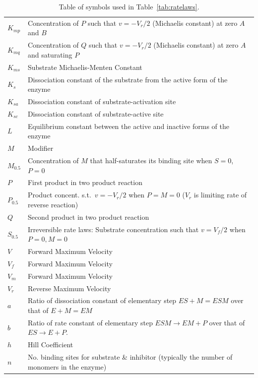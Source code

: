 \documentclass[10pt]{cekarticle}
\newcommand{\changed}[1]{\textcolor{BrickRed}{#1}}
\begin{document}
\begin{table}[ht]
\begin{tabular}{lp{5.5in}}
    $K_{mp}$	& Concentration of $P$ such that $v = -V_r/2$  (Michaelis constant) at zero $A$ and $B$ \\
    $K_{mq}$	& Concentration of $Q$ such that $v = -V_r/2$  (Michaelis constant) at zero $A$ and saturating $P$ \\
    $K_{ms}$	& Substrate Michaelis-Menten Constant \\
    $K_s$	& Dissociation constant of the substrate from the active form of the enzyme \\
    $K_{sa}$	& Dissociation constant of substrate-activation site \\
    $K_{sc}$	& Dissociation constant of substrate-active site \\
    $L$		& Equilibrium constant between the active and inactive forms of the enzyme \\
    $M$		& Modifier \\
    $M_{0.5}$	& Concentration of $M$ that half-saturates its binding site when $S = 0$, $P=0$ \\
    $P$		& First product in two product reaction \\
    \changed{$P_{0.5}$}	& Product concent. s.t.\ $v = - V_r/2$ when $P = M = 0$ ($V_r$ is limiting rate of reverse reaction) \\
    $Q$		& Second product in two product reaction \\
    \changed{$S_{0.5}$}	& Irreversible rate laws: Substrate concentration such that $v = V_f/2$ when $P = 0, M=0$ \\
    $V$		& Forward Maximum Velocity \\
    $V_f$	& Forward Maximum Velocity \\
    $V_m$	& Forward Maximum Velocity \\
    $V_r$	& Reverse Maximum Velocity \\
    $a$		& Ratio of dissociation constant of elementary step $ES + M = ESM$ over that of $E + M = EM$ \\
    $b$		& Ratio of rate constant of elementary step $ESM \to EM + P$ over that of $ES \to E + P$. \\
    $h$		& Hill Coefficient \\
    $n$		& No. binding sites for substrate \& inhibitor (typically the number of monomers in the enzyme) \\
    \bottomrule
  \end{tabular}
  \caption{Table of symbols used in Table~\ref{tab:ratelaws}.}
\end{table}




\clearpage





\end{document}
